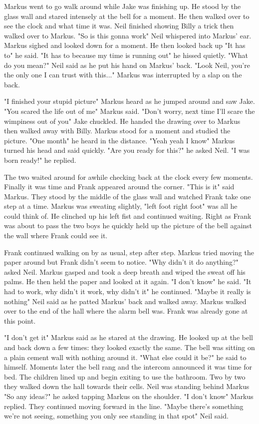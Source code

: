 \documentclass[12pt]{book}
\begin{document}
Markus went to go walk around while Jake was finishing up. He stood by the glass wall and stared intensely at the bell for a moment. He then walked over to see the clock and what time it was. Neil finished showing Billy a trick then walked over to Markus. "So is this gonna work" Neil whispered into Markus' ear. Markus sighed and looked down for a moment. He then looked back up "It has to" he said. "It has to because my time is running out" he hissed quietly. "What do you mean?" Neil said as he put his hand on Markus' back. "Look Neil, you're the only one I can trust with this..." Markus was interrupted by a slap on the back.

"I finished your stupid picture" Markus heard as he jumped around and saw Jake. "You scared the life out of me" Markus said. "Don't worry, next time I'll scare the wimpiness out of you" Jake chuckled. He handed the drawing over to Markus then walked away with Billy. Markus stood for a moment and studied the picture. "One month" he heard in the distance. "Yeah yeah I know" Markus turned his head and said quickly. "Are you ready for this?" he asked Neil. "I was born ready!" he replied.

The two waited around for awhile checking back at the clock every few moments. Finally it was time and Frank appeared around the corner. "This is it" said Markus. They stood by the middle of the glass wall and watched Frank take one step at a time. Markus was sweating slightly, "left foot right foot" was all he could think of. He clinched up his left fist and continued waiting. Right as Frank was about to pass the two boys he quickly held up the picture of the bell against the wall where Frank could see it.

Frank continued walking on by as usual, step after step. Markus tried moving the paper around but Frank didn't seem to notice. "Why didn't it do anything?" asked Neil. Markus gasped and took a deep breath and wiped the sweat off his palms. He then held the paper and looked at it again. "I don't know" he said. "It had to work, why didn't it work, why didn't it" he continued. "Maybe it really is nothing" Neil said as he patted Markus' back and walked away. Markus walked over to the end of the hall where the alarm bell was. Frank was already gone at this point.

"I don't get it" Markus said as he stared at the drawing. He looked up at the bell and back down a few times: they looked exactly the same. The bell was sitting on a plain cement wall with nothing around it. "What else could it be?" he said to himself. Moments later the bell rang and the intercom announced it was time for bed. The children lined up and begin exiting to use the bathroom. Two by two they walked down the hall towards their cells. Neil was standing behind Markus "So any ideas?" he asked tapping Markus on the shoulder. "I don't know" Markus replied. They continued moving forward in the line. "Maybe there's something we're not seeing, something you only see standing in that spot" Neil said.
\end{document}

